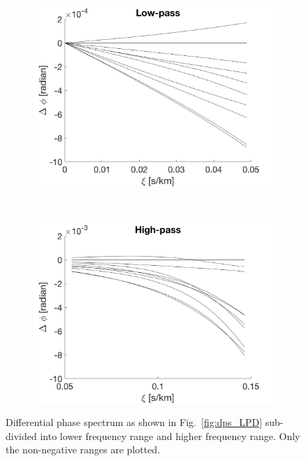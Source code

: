 \begin{figure}[tbp]	
    \begin{subfigure}[b]{0.49\textwidth}
        \includegraphics[width=\textwidth]{./Figures/Methods/4-Relative_phase_angle_L.png}
    \end{subfigure}
	~
    \begin{subfigure}[b]{0.49\textwidth}
        \includegraphics[width=\textwidth]{./Figures/Methods/4-Relative_phase_angle_H.png}
    \end{subfigure}	
    
    \caption[Low-pass and high-pass filters]
    {Differential phase spectrum as shown in Fig.~\ref{fig:dps_LPD} sub-divided into lower frequency range and higher frequency range. Only the non-negative ranges are plotted.}
\label{fig:low-high-pass}
\end{figure}    

